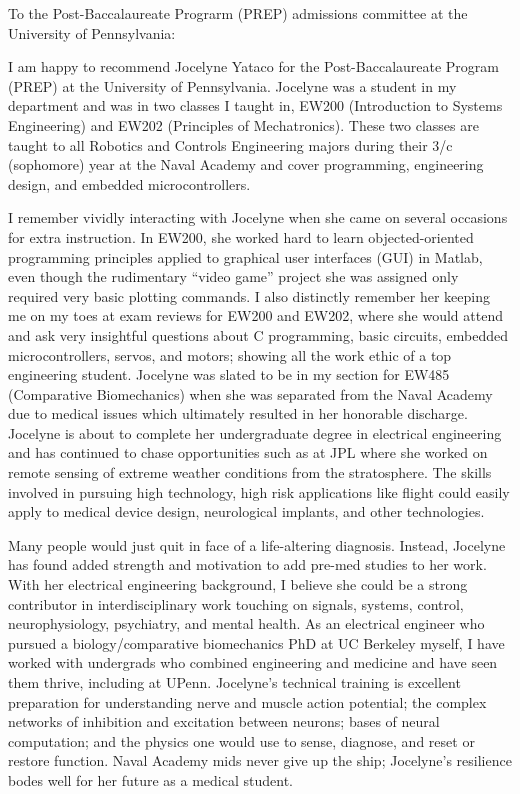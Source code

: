 \documentclass[10pt]{wrceletter}
\date{\today}
\begin{document}
\begin{letter}{%
}

\opening{To the Post-Baccalaureate Prograrm (PREP) admissions committee at the University of Pennsylvania:}
\raggedright %
\setlength{\parindent}{15pt} %

I am happy to recommend Jocelyne Yataco for the Post-Baccalaureate Program (PREP) at the University of Pennsylvania. Jocelyne was a student in my department and was in two classes I taught in, EW200 (Introduction to Systems Engineering) and EW202 (Principles of Mechatronics). These two classes are taught to all Robotics and Controls Engineering majors during their 3/c (sophomore) year at the Naval Academy and cover programming, engineering design, and embedded microcontrollers.  

I remember vividly interacting with Jocelyne when she came on several occasions for extra instruction. In EW200, she worked hard to learn objected-oriented programming principles applied to graphical user interfaces (GUI) in Matlab, even though the rudimentary ``video game'' project she was assigned only required very basic plotting commands. I also distinctly remember her keeping me on my toes at exam reviews for EW200 and EW202, where she would attend and ask very insightful questions about C programming, basic circuits, embedded microcontrollers, servos, and motors; showing all the work ethic of a top engineering student. Jocelyne was slated to be in my section for EW485 (Comparative Biomechanics) when she was separated from the Naval Academy due to medical issues which ultimately resulted in her honorable discharge. Jocelyne is about to complete her undergraduate degree in electrical engineering and has continued to chase opportunities such as at JPL where she worked on remote sensing of extreme weather conditions from the stratosphere. The skills involved in pursuing high technology, high risk applications like flight could easily apply to medical device design, neurological implants, and other technologies.

Many people would just quit in face of a life-altering diagnosis.  Instead, Jocelyne has found added strength and motivation to add pre-med studies to her work. With her electrical engineering background, I believe she could be a strong contributor in interdisciplinary work touching on signals, systems, control, neurophysiology, psychiatry, and mental health. As an electrical engineer who pursued a biology/comparative biomechanics PhD at UC Berkeley myself, I have worked with undergrads who combined engineering and medicine and have seen them thrive, including at UPenn. Jocelyne's technical training is excellent preparation for understanding nerve and muscle action potential; the complex networks of inhibition and excitation between neurons; bases of neural computation; and the physics one would use to sense, diagnose, and reset or restore function. Naval Academy mids never give up the ship; Jocelyne's resilience bodes well for her future as a medical student. 


\end{letter}
\end{document}
